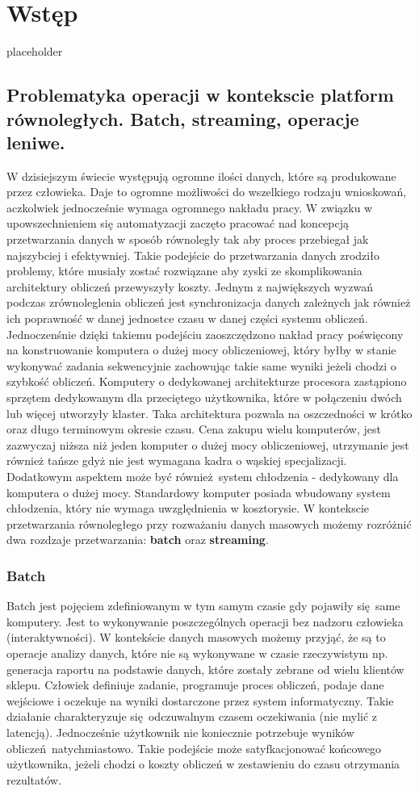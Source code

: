 \chapter{Wstęp} \label{chap.introduction}
{placeholder}

\section{Problematyka operacji w kontekscie platform równoległych. Batch, streaming, operacje leniwe.}
W dzisiejszym świecie występują ogromne ilości danych, które są produkowane przez człowieka. Daje to ogromne możliwości do wszelkiego rodzaju wnioskowań, aczkolwiek jednocześnie wymaga ogromnego nakładu pracy. W związku w upowszechnieniem się automatyzacji zaczęto pracować nad koncepcją przetwarzania danych w sposób równoległy tak aby proces przebiegał jak najszybciej i efektywniej. Takie podejście do przetwarzania danych zrodziło problemy, które musiały zostać rozwiązane aby zyski ze skomplikowania architektury obliczeń przewyszyły koszty. Jednym z największych wyzwań podczas zrównoleglenia obliczeń jest synchronizacja danych zależnych jak również ich poprawność w danej jednostce czasu w danej części systemu obliczeń. Jednoczenśnie dzięki takiemu podejściu zaoszczędzono nakład pracy poświęcony na konstruowanie komputera o dużej mocy obliczeniowej, który byłby w stanie wykonywać zadania sekwencyjnie zachowując takie same wyniki jeżeli chodzi o szybkość obliczeń. Komputery o dedykowanej architekturze procesora zastąpiono sprzętem dedykowanym dla przeciętego użytkownika, które w połączeniu dwóch lub więcej utworzyły klaster. Taka architektura pozwala na oszczedności w krótko oraz długo terminowym okresie czasu. Cena zakupu wielu komputerów, jest zazwyczaj niższa niż jeden komputer o dużej mocy obliczeniowej, utrzymanie jest również tańsze gdyż nie jest wymagana kadra o wąskiej specjalizacji. Dodatkowym aspektem może być również system chłodzenia - dedykowany dla komputera o dużej mocy. Standardowy komputer posiada wbudowany system chłodzenia, który nie wymaga uwzględnienia w kosztorysie. W kontekscie przetwarzania równoległego przy rozważaniu danych masowych możemy rozróżnić dwa rozdzaje przetwarzania: \textbf{batch} oraz \textbf{streaming}.
\subsection{Batch} Batch jest pojęciem zdefiniowanym w tym samym czasie gdy pojawiły się same komputery. Jest to wykonywanie poszczególnych operacji bez nadzoru człowieka (interaktywności). W kontekście danych masowych możemy przyjąć, że są to operacje analizy danych, które nie są wykonywane w czasie rzeczywistym np. generacja raportu na podstawie danych, które zostały zebrane od wielu klientów sklepu. Człowiek definiuje zadanie, programuje proces obliczeń, podaje dane wejściowe i oczekuje na wyniki dostarczone przez system informatyczny. Takie działanie charakteryzuje się odczuwalnym czasem oczekiwania (nie mylić z latencją). Jednocześnie użytkownik nie koniecznie potrzebuje wyników obliczeń natychmiastowo. Takie podejście może satyfkacjonować końcowego użytkownika, jeżeli chodzi o koszty obliczeń w zestawieniu do czasu otrzymania rezultatów.
